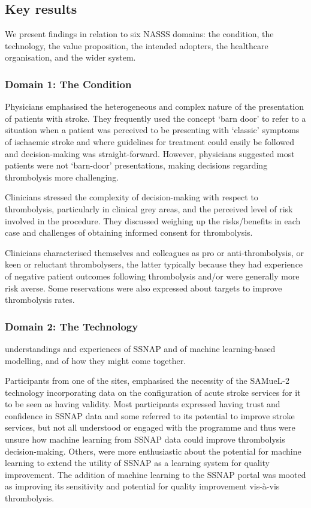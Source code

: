 \subsection{Key results}

We present findings in relation to six NASSS domains: the condition, the technology, the value proposition, the intended adopters, the healthcare organisation, and the wider system.

\subsubsection{Domain 1: The Condition}

Physicians emphasised the heterogeneous and complex nature of the presentation of patients with stroke. They frequently used the concept ‘barn door’ to refer to a situation when a patient was perceived to be presenting with ‘classic’ symptoms of ischaemic stroke and where guidelines for treatment could easily be followed and decision-making was straight-forward. However, physicians suggested most patients were not ‘barn-door’ presentations, making decisions regarding thrombolysis more challenging.

Clinicians stressed the complexity of decision-making with respect to thrombolysis, particularly in clinical grey areas, and the perceived level of risk involved in the procedure. They discussed weighing up the risks/benefits in each case and challenges of obtaining informed consent for thrombolysis.

Clinicians characterised themselves and colleagues as pro or anti-thrombolysis, or keen or reluctant thrombolysers, the latter typically because they had experience of negative patient outcomes following thrombolysis and/or were generally more risk averse. Some reservations were also expressed about targets to improve thrombolysis rates.

\subsubsection{Domain 2: The Technology}

understandings and experiences of SSNAP and of machine learning-based modelling, and of how they might come together.

Participants from one of the sites, emphasised the necessity of the SAMueL-2 technology incorporating data on the configuration of acute stroke services for it to be seen as having validity. Most participants expressed having trust and confidence in SSNAP data and some referred to its potential to improve stroke services, but not all understood or engaged with the programme and thus were unsure how machine learning from SSNAP data could improve thrombolysis decision-making. Others, were more enthusiastic about the potential for machine learning to extend the utility of SSNAP as a learning system for quality improvement. The addition of machine learning to the SSNAP portal was mooted as improving its sensitivity and potential for quality improvement vis-à-vis thrombolysis.


